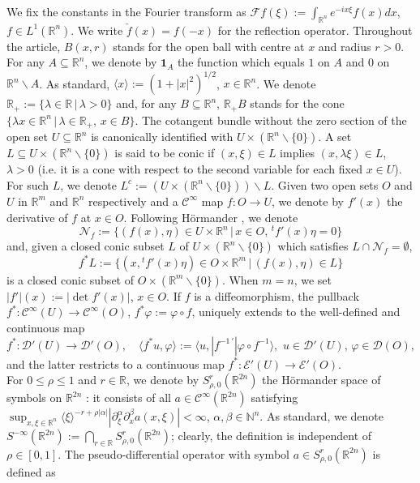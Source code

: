 \documentclass[12pt,reqno]{amsart}
\newcommand{\NN}{\mathbb N}
\newcommand{\RR}{\mathbb R}
\newcommand{\EE}{\mathcal E}
\newcommand{\DD}{\mathcal D}
\theoremstyle{plain}
\theoremstyle{remark}
\theoremstyle{definition}
\numberwithin{equation}{section}
\begin{document}
We fix the constants in the Fourier transform as $\mathcal{F}f(\xi):=\int_{\RR^n}e^{-ix\xi}f(x)dx$, $f\in L^1(\RR^n)$. We write $\check{f}(x)=f(-x)$ for the reflection operator. Throughout the article, $B(x,r)$ stands for the open ball with centre at $x$ and radius $r>0$. For any $A\subseteq \RR^n$, we denote by $\mathbf{1}_A$ the function which equals $1$ on $A$ and $0$ on $\RR^n\backslash A$. As standard, $\langle x\rangle:=(1+|x|^2)^{1/2}$, $x\in\RR^n$. We denote $\RR_+:=\{\lambda\in\RR\,|\, \lambda>0\}$ and, for any $B\subseteq \RR^n$, $\RR_+B$ stands for the cone $\{\lambda x\in\RR^n\,|\, \lambda\in\RR_+,\, x\in B\}$. The cotangent bundle without the zero section of the open set $U\subseteq \RR^n$ is canonically identified with $U\times (\RR^n\backslash\{0\})$. A set $L\subseteq U\times (\RR^n\backslash\{0\})$ is said to be conic if $(x,\xi)\in L$ implies $(x,\lambda\xi)\in L$, $\lambda>0$ (i.e. it is a cone with respect to the second variable for each fixed $x\in U$). For such $L$, we denote $L^c:=(U\times (\RR^n\backslash\{0\}))\backslash L$. Given two open sets $O$ and $U$ in $\RR^m$ and $\RR^n$ respectively and a $\mathcal{C}^{\infty}$ map $f:O\rightarrow U$, we denote by $f'(x)$ the derivative of $f$ at $x\in O$. Following H\"ormander \cite{hor}, we denote
\begin{equation}\label{nor-toa-mapinskl}
\mathcal{N}_f:=\{(f(x),\eta)\in U\times \RR^n\,|\, x\in O,\,{}^tf'(x)\eta=0\}
\end{equation}
and, given a closed conic subset $L$ of $U\times(\RR^n\backslash\{0\})$ which satisfies $L\cap \mathcal{N}_f=\emptyset$,
\begin{equation*}
f^*L:=\{(x,{}^tf'(x)\eta)\in O\times \RR^m\,|\, (f(x),\eta)\in L\}
\end{equation*}
is a closed conic subset of $O\times(\RR^m\backslash\{0\})$. When $m=n$, we set $|f'|(x):=|\det f'(x)|$, $x\in O$. If $f$ is a diffeomorphism, the pullback $f^*:\mathcal{C}^{\infty}(U)\rightarrow\mathcal{C}^{\infty}(O)$, $f^*\varphi:=\varphi\circ f$, uniquely extends to the well-defined and continuous map
\begin{equation*}
f^*:\DD'(U)\rightarrow \DD'(O),\quad \langle f^*u,\varphi\rangle:=\langle u,|f^{-1\, '}|\varphi\circ f^{-1}\rangle,\,\, u\in\DD'(U),\, \varphi\in\DD(O),
\end{equation*}
and the latter restricts to a continuous map $f^*:\EE'(U)\rightarrow\EE'(O)$. \\
\indent For $0\leq \rho\leq1$ and $r\in\RR$, we denote by $S^r_{\rho,0}(\RR^{2n})$ the H\"ormander space of symbols on $\RR^{2n}$ \cite{hormander,hor2}: it consists of all $a\in\mathcal{C}^{\infty}(\RR^{2n})$ satisfying $\sup_{x,\xi\in\RR^n}\langle\xi\rangle^{-r+\rho|\alpha|}|\partial^{\alpha}_{\xi}\partial^{\beta}_xa(x,\xi)|<\infty$, $\alpha,\beta\in\NN^n$. As standard, we denote $S^{-\infty}(\RR^{2n}):=\bigcap_{r\in\RR}S^r_{\rho,0}(\RR^{2n})$; clearly, the definition is independent of $\rho\in[0,1]$. The pseudo-differential operator with symbol $a\in S^r_{\rho,0}(\RR^{2n})$ is defined as
\end{document}
